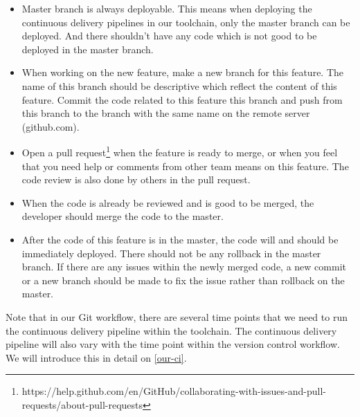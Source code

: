 \begin{itemize}
\item Master branch is always deployable. This means when deploying the continuous delivery pipelines in our toolchain, only the master branch can be deployed. And there shouldn't have any code which is not good to be deployed in the master branch.
\item When working on the new feature, make a new branch for this feature. The name of this branch should be descriptive which reflect the content of this feature. Commit the code related to this feature this branch and push from this branch to the branch with the same name on the remote server (github.com).
\item Open a pull request\footnote{https://help.github.com/en/GitHub/collaborating-with-issues-and-pull-requests/about-pull-requests} when the feature is ready to merge, or when you feel that you need help or comments from other team means on this feature. The code review is also done by others in the pull request.
\item When the code is already be reviewed and is good to be merged, the developer should merge the code to the master.
\item After the code of this feature is in the master, the code will and should be immediately deployed. There should not be any rollback in the master branch. If there are any issues within the newly merged code, a new commit or a new branch should be made to fix the issue rather than rollback on the master.
\end{itemize}
\par
Note that in our Git workflow, there are several time points that we need to run the continuous delivery pipeline within the toolchain. The continuous delivery pipeline will also vary with the time point within the version control workflow. We will introduce this in detail on \ref{our-ci}.



